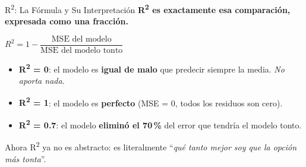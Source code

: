 \documentclass[aspectratio=169, 11pt]{beamer}
\begin{document}
\begin{frame}{R\textsuperscript{2}: La Fórmula y Su Interpretación}
  \vspace{-4pt}
  {\footnotesize\color{arcaDark}\bfseries
    R\textsuperscript{2} es exactamente esa comparación, expresada como una fracción.}

  \vspace{10pt}
  \begin{center}
    \begin{tcolorbox}[colback=arcaGray, colframe=arcaRed, boxrule=1pt,
                      arc=4pt, width=0.7\textwidth]
    \centering
    \large
    $R^2 = 1 - \dfrac{\text{MSE del modelo}}{\text{MSE del modelo tonto}}$
    \end{tcolorbox}
  \end{center}

  \vspace{12pt}
  {\footnotesize
  \begin{itemize}\setlength{\itemsep}{8pt}
    \item[{\color{arcaRed}\faArrowRight}]
      \textbf{R\textsuperscript{2} = 0}: el modelo es \textbf{igual de malo}
      que predecir siempre la media. \textit{No aporta nada.}
    \item[{\color{arcaRed}\faArrowRight}]
      \textbf{R\textsuperscript{2} = 1}: el modelo es \textbf{perfecto}
      (MSE = 0, todos los residuos son cero).
    \item[{\color{arcaRed}\faArrowRight}]
      \textbf{R\textsuperscript{2} = 0.7}: el modelo \textbf{eliminó el 70\,\%}
      del error que tendría el modelo tonto.
  \end{itemize}
  }

  \vspace{8pt}
  {\footnotesize\color{arcaDark}
    \faLightbulb\hspace{4pt}
    Ahora R\textsuperscript{2} ya no es abstracto: es literalmente
    ``\textit{qué tanto mejor soy que la opción más tonta}''.}
\end{frame}
\end{document}
